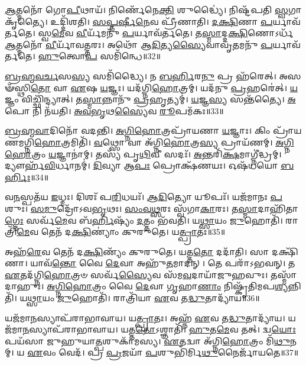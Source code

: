 \-\ul{𑌆}\-𑌤𑍍𑌮𑌨𑍋᳴ 𑌗𑍋\-\ul{𑌪𑍀}\-𑌥𑌾𑌯᳴।
𑌨𑌿𑌰𑍍𑌣𑍇᳴𑌨𑍇\-\ul{𑌕𑍍𑌤𑌿} 𑌶𑍁𑌦𑍍𑌧𑍍𑌯𑍈॑।
𑌨𑌿𑌷𑍍𑌟᳴𑌪𑌤𑌿 \ul{𑌸𑍍𑌵}\-𑌗𑌾𑌕𑍃᳴𑌤𑍍𑌯𑍈।
𑌉𑌦𑍍𑌦𑌿᳴𑌶𑌤𑌿।
\-\ul{𑌸}\-\-\ul{𑌪𑍍𑌤}\-\-\ul{𑌰𑍍}\-𑌷𑍀\-\ul{𑌨𑍇}\-𑌵 𑌪𑍍𑌰𑍀᳴𑌣𑌾𑌤𑌿।
\-\ul{𑌦}\-\-\ul{𑌕𑍍𑌷𑌿}\-𑌣𑌾 \ul{𑌪}\-𑌰𑍍𑌯𑌾𑌵᳴𑌰𑍍𑌤𑌤𑍇।
𑌸𑍍𑌵\-\ul{𑌮𑍇}\-𑌵 \ul{𑌵𑍀}\-𑌰𑍍𑌯᳴𑌮𑌨𑍁᳴ \ul{𑌪}\-𑌰𑍍𑌯𑌾𑌵᳴𑌰𑍍𑌤𑌤𑍇।
𑌤\-\ul{𑌸𑍍𑌮𑌾}\-𑌦𑍍𑌦\-\ul{𑌕𑍍𑌷𑌿}\-𑌣𑍋\-𑌽𑌰𑍍𑌧᳴ \ul{𑌆}\-𑌤𑍍𑌮𑌨𑍋᳴ \ul{𑌵𑍀}\-𑌰𑍍𑌯𑌾᳴𑌵𑌤𑍍𑌤𑌰𑌃।
𑌅𑌥𑍋᳴ 𑌆\-\ul{𑌦𑌿}\-𑌤𑍍𑌯\-\ul{𑌸𑍍𑌯𑍈}\-𑌵𑌾𑌵𑍃\-\ul{𑌤}\-𑌮𑌨𑍁᳴ \ul{𑌪}\-𑌰𑍍𑌯𑌾𑌵᳴𑌰𑍍𑌤𑌤𑍇।
\-\ul{𑌹𑍁}\-𑌤𑍍𑌵𑍋\-\ul{𑌪} 𑌸𑌮𑌿᳴𑌨𑍍𑌧𑍇॥32॥

\-\ul{𑌬𑍍𑌰}\-\-\ul{𑌹𑍍𑌮}\-\-\ul{𑌵}\-\-\ul{𑌰𑍍𑌚}\-𑌸\-\ul{𑌸𑍍𑌯} 𑌸𑌮𑌿᳴𑌦𑍍𑌧𑍍𑌯𑍈।
𑌨 \ul{𑌬}\-\-\ul{𑌰𑍍}\-𑌹𑌿𑌰\-\ul{𑌨𑍁}\- 𑌪𑍍𑌰 𑌹᳴𑌰𑍇𑌤𑍍।
𑌅𑌸𑍟᳴𑌸𑍍𑌥𑌿\-\ul{𑌤𑍋} 𑌵𑌾 \ul{𑌏}\-𑌷 \ul{𑌯}\-𑌜𑍍𑌞𑌃।
𑌯𑌦᳴𑌗𑍍𑌨𑌿\-\ul{𑌹𑍋}\-𑌤𑍍𑌰𑌮𑍍।
𑌯𑌦᳴𑌨𑍁 \ul{𑌪𑍍𑌰}\-𑌹𑌰𑍇॑𑌤𑍍।
\-\ul{𑌯}\-𑌜𑍍𑌞𑌂 𑌵𑌿𑌚𑍍𑌛𑌿᳴𑌨𑍍𑌦𑍍𑌯𑌾𑌤𑍍।
𑌤\-\ul{𑌸𑍍𑌮𑌾}\-𑌨𑍍𑌨𑌾𑌨𑍁᳴ \ul{𑌪𑍍𑌰}\-𑌹𑍃𑌤𑍍𑌯𑌮𑍍॑।
\-\ul{𑌯}\-𑌜𑍍𑌞\-\ul{𑌸𑍍𑌯} 𑌸𑌨𑍍𑌤᳴𑌤𑍍𑌯𑍈।
\-\ul{𑌅}\-𑌪𑍋 𑌨𑌿 𑌨᳴𑌯𑌤𑌿।
\-\ul{𑌅}\-\-\ul{𑌵}\-\-\ul{𑌭𑍃}\-𑌥\-\ul{𑌸𑍍𑌯𑍈}\-𑌵 \ul{𑌰𑍂}\-𑌪𑌮᳴𑌕𑌃॥33॥\anuvakamend[\-\ul{𑌅}\-\-\ul{𑌭}\-\-\ul{𑌵}\-\-\ul{𑌨𑍍𑌭}\-\-\ul{𑌵}\-\-\ul{𑌤𑌿} \ul{𑌜𑍁}\-\-\ul{𑌹𑍁}\-𑌯𑌾𑌨𑍍𑌨᳴𑌯𑌤𑌿 𑌮𑌾\-\ul{𑌰𑍍𑌷𑍍𑌟𑌿} 𑌦𑍍𑌵𑌿𑌃 𑌪𑍍𑌰𑌾𑌶𑍍𑌞𑌾᳴𑌤𑌿 𑌪𑍍𑌰𑌾𑌜𑌾\-\ul{𑌪}\-𑌤𑍍𑌯𑌮𑌾𑌚𑌾᳴𑌮𑌤𑍀𑌨𑍍𑌧𑍇\-𑌽𑌕𑌃]

\-\ul{𑌬𑍍𑌰}\-\-\ul{𑌹𑍍𑌮}\-\-\ul{𑌵𑌾}\-𑌦𑌿𑌨𑍋᳴ 𑌵𑌦𑌨𑍍𑌤𑌿।
\-\ul{𑌅}\-\-\ul{𑌗𑍍𑌨𑌿}\-\-\ul{𑌹𑍋}\-𑌤𑍍𑌰𑌪𑍍𑌰𑌾᳴𑌯𑌣𑌾 \ul{𑌯}\-𑌜𑍍𑌞𑌾𑌃।
𑌕𑌿𑌂 𑌪𑍍𑌰𑌾᳴𑌯𑌣𑌮𑌗𑍍𑌨𑌿\-\ul{𑌹𑍋}\-𑌤𑍍𑌰𑌮𑌿𑌤𑌿᳴।
\-\ul{𑌵}\-𑌥𑍍𑌸𑍋 𑌵𑌾 𑌅᳴𑌗𑍍𑌨𑌿\-\ul{𑌹𑍋}\-𑌤𑍍𑌰\-\ul{𑌸𑍍𑌯} 𑌪𑍍𑌰𑌾𑌯᳴𑌣𑌮𑍍।
\-\ul{𑌅}\-\-\ul{𑌗𑍍𑌨𑌿}\-\-\ul{𑌹𑍋}\-𑌤𑍍𑌰𑌂 \ul{𑌯}\-𑌜𑍍𑌞𑌾𑌨𑌾॑𑌮𑍍।
𑌤𑌸𑍍𑌯᳴ 𑌪𑍃\-\ul{𑌥𑌿}\-𑌵𑍀 𑌸𑌦𑌃᳴।
\-\ul{𑌅}\-𑌨𑍍𑌤𑌰𑌿᳴\-\ul{𑌕𑍍𑌷}\-𑌮𑌾𑌗𑍍𑌨𑍀॑𑌦𑍍𑌧𑍍𑌰𑌮𑍍।
𑌦𑍍𑌯𑍗𑌰𑍍\mbox{}𑌹᳴\-\ul{𑌵𑌿}\-𑌰𑍍𑌧𑌾𑌨𑌮𑍍॑।
\-\ul{𑌦𑌿}\-𑌵𑍍𑌯𑌾 𑌆\-\ul{𑌪𑌃} 𑌪𑍍𑌰𑍋𑌕𑍍𑌷᳴𑌣𑌯𑌃।
𑌓𑌷᳴𑌧𑌯𑍋 \ul{𑌬}\-\-\ul{𑌰𑍍}\-𑌹𑌿𑌃॥34॥

𑌵\-\ul{𑌨}\-𑌸𑍍𑌪𑌤᳴𑌯 \ul{𑌇}\-𑌧𑍍𑌮𑌃।
𑌦𑌿𑌶𑌃᳴ 𑌪\-\ul{𑌰𑌿}\-𑌧𑌯𑌃᳴।
\-\ul{𑌆}\-\-\ul{𑌦𑌿}\-𑌤𑍍𑌯𑍋 𑌯𑍂𑌪𑌃᳴।
𑌯𑌜᳴𑌮𑌾𑌨𑌃 \ul{𑌪}\-𑌶𑍁𑌃।
\-\ul{𑌸}\-\-\ul{𑌮𑍁}\-𑌦𑍍𑌰𑍋᳴\-𑌽𑌵\-\ul{𑌭𑍃}\-𑌥𑌃।
\-\ul{𑌸𑌂}\-\-\ul{𑌵}\-\-\ul{𑌥𑍍𑌸}\-𑌰𑌃 𑌸𑍍𑌵᳴𑌗𑌾\-\ul{𑌕𑌾}\-𑌰𑌃।
𑌤\-\ul{𑌸𑍍𑌮𑌾}\-𑌦𑌾𑌹𑌿᳴𑌤𑌾\-\ul{𑌗𑍍𑌨𑍇𑌃} 𑌸𑌰𑍍𑌵᳴\-\ul{𑌮𑍇}\-𑌵 𑌬᳴\-\ul{𑌰𑍍𑌹𑌿}\-𑌷𑍍𑌯𑌂᳴ \ul{𑌦}\-𑌤𑍍𑌤𑌂 𑌭᳴𑌵𑌤𑌿।
𑌯\-\ul{𑌥𑍍𑌸𑌾}\-𑌯𑌂 \ul{𑌜𑍁}\-𑌹𑍋𑌤𑌿᳴।
𑌰𑌾𑌤𑍍𑌰𑌿᳴\-\ul{𑌮𑍇}\-𑌵 𑌤𑍇𑌨᳴ 𑌦\-\ul{𑌕𑍍𑌷𑌿}\-𑌣𑍍𑌯𑌾𑌂॑ 𑌕𑍁𑌰𑍁𑌤𑍇।
𑌯\-\ul{𑌤𑍍𑌪𑍍𑌰𑌾}\-𑌤𑌃॥35॥

𑌅𑌹᳴\-\ul{𑌰𑍇}\-𑌵 𑌤𑍇𑌨᳴ 𑌦\-\ul{𑌕𑍍𑌷𑌿}\-𑌣𑍍𑌯𑌂᳴ 𑌕𑍁𑌰𑍁𑌤𑍇।
𑌯𑌤𑍍𑌤\-\ul{𑌤𑍋} 𑌦𑌦𑌾᳴𑌤𑌿।
𑌸𑌾 𑌦𑌕𑍍𑌷𑌿᳴𑌣𑌾।
𑌯𑌾𑌵᳴\-\ul{𑌨𑍍𑌤𑍋} 𑌵𑍈 \ul{𑌦𑍇}\-𑌵𑌾 𑌅𑌹𑍁᳴\-\ul{𑌤}\-𑌮𑌾𑌦𑌨𑍍।
𑌤𑍇 𑌪𑌰𑌾᳴\-𑌽𑌭𑌵𑌨𑍍।
𑌤 \ul{𑌏}\-𑌤𑌦᳴𑌗𑍍𑌨𑌿\-\ul{𑌹𑍋}\-𑌤𑍍𑌰𑍞 𑌸𑌰𑍍𑌵᳴\-\ul{𑌸𑍍𑌯𑍈}\-𑌵 𑌸᳴𑌮\-\ul{𑌵}\-𑌦𑌾𑌯𑌾᳴𑌜𑍁𑌹𑌵𑍁𑌃।
𑌤𑌸𑍍𑌮𑌾᳴𑌦𑌾𑌹𑍁𑌃।
\-\ul{𑌅}\-\-\ul{𑌗𑍍𑌨𑌿}\-\-\ul{𑌹𑍋}\-𑌤𑍍𑌰𑌂 𑌵𑍈 \ul{𑌦𑍇}\-𑌵𑌾 \ul{𑌗𑍃}\-𑌹𑌾\-\ul{𑌣𑌾𑌂} 𑌨𑌿𑌷𑍍𑌕𑍃᳴𑌤𑌿𑌮𑌪\-\ul{𑌶𑍍𑌯}\-𑌨𑍍𑌨𑌿𑌤𑌿᳴।
𑌯\-\ul{𑌥𑍍𑌸𑌾}\-𑌯𑌂 \ul{𑌜𑍁}\-𑌹𑍋𑌤𑌿᳴।
𑌰𑌾𑌤𑍍𑌰𑌿᳴𑌯𑌾 \ul{𑌏}\-𑌵 𑌤\-\ul{𑌦𑍍𑌧𑍁}\-𑌤𑌾𑌦𑍍𑌯𑌾᳴𑌯॥36॥

𑌯𑌜᳴𑌮𑌾\-\ul{𑌨}\-𑌸𑍍𑌯𑌾𑌪᳴𑌰𑌾\-𑌭𑌾𑌵𑌾𑌯।
𑌯\-\ul{𑌤𑍍𑌪𑍍𑌰𑌾}\-𑌤𑌃।
𑌅𑌹𑍍𑌨᳴ \ul{𑌏}\-𑌵 𑌤\-\ul{𑌦𑍍𑌧𑍁}\-𑌤𑌾𑌦𑍍𑌯𑌾᳴𑌯।
𑌯𑌜᳴𑌮𑌾\-\ul{𑌨}\-𑌸𑍍𑌯𑌾𑌪᳴𑌰𑌾𑌭𑌾𑌵𑌾𑌯।
𑌯𑌤𑍍𑌤\-\ul{𑌤𑍋}\-\-𑌽𑌶𑍍𑌞𑌾𑌤𑌿᳴।
\-\ul{𑌹𑍁}\-𑌤\-\ul{𑌮𑍇}\-𑌵 𑌤𑌤𑍍।
𑌦𑍍𑌵\-\ul{𑌯𑍋𑌃} 𑌪𑌯᳴𑌸𑌾 𑌜𑍁𑌹𑍁𑌯𑌾\-\ul{𑌤𑍍𑌪}\-𑌶𑍁𑌕𑌾᳴𑌮𑌸𑍍𑌯।
\-\ul{𑌏}\-𑌤𑌦𑍍𑌵𑌾 𑌅᳴𑌗𑍍𑌨𑌿\-\ul{𑌹𑍋}\-𑌤𑍍𑌰𑌂 𑌮𑌿᳴\-\ul{𑌥𑍁}\-𑌨𑌮𑍍।
𑌯 \ul{𑌏}\-𑌵𑌂 𑌵𑍇𑌦᳴।
𑌪𑍍𑌰 \ul{𑌪𑍍𑌰}\-𑌜𑌯𑌾᳴ \ul{𑌪}\-𑌶𑍁𑌭𑌿᳴𑌰𑍍𑌮𑌿\-\ul{𑌥𑍁}\-𑌨𑍈𑌰𑍍𑌜𑌾᳴𑌯𑌤𑍇॥37॥

